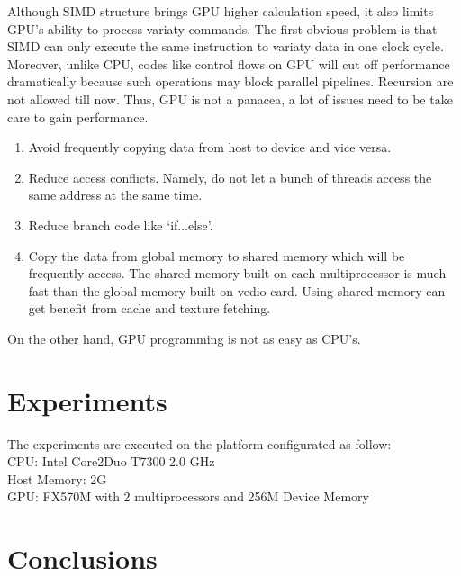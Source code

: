\documentclass[12pt]{article}
\begin{document}
Although SIMD structure brings GPU higher calculation speed, it also limits GPU's ability to process variaty commands. The first obvious problem is that SIMD can only execute the same instruction to variaty data in one clock cycle. Moreover, unlike CPU, codes like control flows on GPU will cut off performance dramatically because such operations may block parallel pipelines. Recursion are not allowed till now. Thus, GPU is not a panacea, a lot of issues need to be take care to gain performance. 
\begin{enumerate}
\item Avoid frequently copying data from host to device and vice versa.
\item Reduce access conflicts. Namely, do not let a bunch of threads access the same address at the same time.
\item Reduce branch code like `if...else'.
\item Copy the data from global memory to shared memory which will be frequently access. The shared memory built on each multiprocessor is much fast than the global memory built on vedio card. Using shared memory can get benefit from cache and texture fetching.
\end{enumerate}

On the other hand, GPU programming is not as easy as CPU's.

\section{Experiments}
The experiments are executed on the platform configurated as follow:\\
CPU: Intel Core2Duo T7300 2.0 GHz\\
Host Memory: 2G\\
GPU: FX570M with 2 multiprocessors and 256M Device Memory


\section{Conclusions}


%
%
\end{document}
